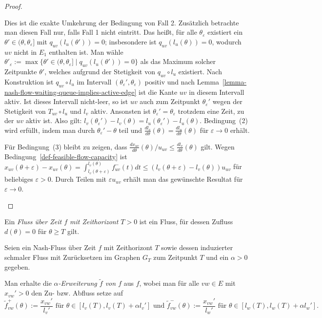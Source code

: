 \begin{proof}
\begin{description}
		Dies ist die exakte Umkehrung der Bedingung von Fall 2.
		Zusätzlich betrachte man diesen Fall nur, falls Fall 1 nicht eintritt.
		Das heißt, für alle $\theta_\varepsilon$ existiert ein $\theta'\in(\theta, \theta_\varepsilon]$ mit $q_{uv}(l_u(\theta')) = 0$; insbesondere ist $q_{uv}(l_u(\theta))= 0$, wodurch $uv$ nicht in $E_1$ enthalten ist.
		Man wähle $\theta'_\varepsilon:=\max\{ \theta'\in (\theta, \theta_\varepsilon] \mid q_{uv}(l_u(\theta')) = 0 \}$ als das Maximum solcher Zeitpunkte $\theta'$, welches aufgrund der Stetigkeit von $q_{uv}\circ l_u$ existiert.
		Nach Konstruktion ist $q_{uv}\circ l_u$ im Intervall $(\theta_\varepsilon', \theta_\varepsilon)$ positiv und nach Lemma~\ref{lemma-nash-flow-waiting-queue-implies-active-edge} ist die Kante $uv$ in diesem Intervall aktiv.
		Ist dieses Intervall nicht-leer, so ist $uv$ auch zum Zeitpunkt $\theta_\varepsilon'$ wegen der Stetigkeit von $T_{uv}\circ l_u$ und $l_v$ aktiv.
		Ansonsten ist $\theta_\varepsilon'=\theta_\varepsilon$ trotzdem eine Zeit, zu der $uv$ aktiv ist.
		Also gilt: $l_v(\theta_\varepsilon') - l_v(\theta) = l_u(\theta_\varepsilon') - l_u(\theta)$.
		Bedingung~(2) wird erfüllt, indem man durch $\theta_\varepsilon'-\theta$ teil und $\frac{dl_v}{d\theta}(\theta) = \frac{dl_u}{d\theta}(\theta)$ für $\varepsilon\rightarrow0$ erhält.
		
		Für Bedingung~(3) bleibt zu zeigen, dass $\frac{dx_{uv}}{d\theta}(\theta) /u_{uv}\leq \frac{dl_v}{d\theta}(\theta)$ gilt.
		Wegen Bedingung~\ref{def-feasible-flow-capacity} ist $x_{uv}(\theta + \varepsilon)-x_{uv}(\theta) = \int_{l_v(\theta+\varepsilon)}^{l_v(\theta)} f_{uv}^-(t) dt\leq (l_v(\theta + \varepsilon) - l_v(\theta)) u_{uv}$ für beliebiges $\varepsilon > 0$.
		Durch Teilen mit $\varepsilon u_{uv}$ erhält man das gewünschte Resultat für $\varepsilon \rightarrow 0$.
	\end{description}
\end{proof}

\begin{definition}
	Ein \emph{Fluss über Zeit $f$ mit Zeithorizont $T>0$} ist ein Fluss, für dessen Zufluss $d(\theta)= 0$ für $\theta\geq T$ gilt.
\end{definition}

\begin{definition}
	Seien ein Nash-Fluss über Zeit $f$ mit Zeithorizont $T$ sowie dessen induzierter schmaler Fluss mit Zurücksetzen im Graphen $G_T$ zum Zeitpunkt $T$ und ein $\alpha > 0$ gegeben.
	
	
	Man erhalte die \emph{$\alpha$-Erweiterung $\tilde{f}$ von $f$} aus $f$, wobei man für alle $vw\in E$ mit $x_{vw}'>0$ den Zu- bzw. Abfluss setze auf
	$$\tilde{f}_{vw}^+(\theta):= \frac{x_{vw}'}{l_v'} \text{ für $\theta\in [l_v(T), l_v(T)+\alpha l_v']$ und } \tilde{f}_{vw}^-(\theta):=\frac{x_{vw}'}{l_w'} \text{ für $\theta\in [l_w(T), l_w(T)+\alpha l_w']$.}$$
\end{definition}


